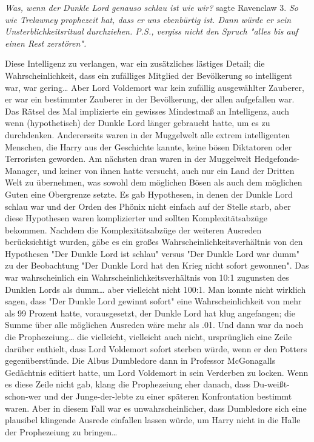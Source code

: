 {\emph{Was, wenn der Dunkle Lord genauso schlau ist wie wir?} sagte Ravenclaw 3. \emph{So wie Trelawney prophezeit hat, dass er uns ebenbürtig ist. Dann würde er sein Unsterblichkeitsritual durchziehen. P.S., vergiss nicht den Spruch "alles bis auf einen Rest zerstören".}

Diese Intelligenz zu verlangen, war ein zusätzliches lästiges Detail; die Wahrscheinlichkeit, dass ein zufälliges Mitglied der Bevölkerung so intelligent war, war gering… Aber Lord Voldemort war kein zufällig ausgewählter Zauberer, er war ein bestimmter Zauberer in der Bevölkerung, der allen aufgefallen war. Das Rätsel des Mal implizierte ein gewisses Mindestmaß an Intelligenz, auch wenn (hypothetisch) der Dunkle Lord länger gebraucht hatte, um es zu durchdenken. Andererseits waren in der Muggelwelt alle extrem intelligenten Menschen, die Harry aus der Geschichte kannte, keine bösen Diktatoren oder Terroristen geworden. Am nächsten dran waren in der Muggelwelt Hedgefonds-Manager, und keiner von ihnen hatte versucht, auch nur ein Land der Dritten Welt zu übernehmen, was sowohl dem möglichen Bösen als auch dem möglichen Guten eine Obergrenze setzte. Es gab Hypothesen, in denen der Dunkle Lord schlau war und der Orden des Phönix nicht einfach auf der Stelle starb, aber diese Hypothesen waren komplizierter und sollten Komplexitätsabzüge bekommen. Nachdem die Komplexitätsabzüge der weiteren Ausreden berücksichtigt wurden, gäbe es ein großes Wahrscheinlichkeitsverhältnis von den Hypothesen "Der Dunkle Lord ist schlau" versus "Der Dunkle Lord war dumm" zu der Beobachtung "Der Dunkle Lord hat den Krieg nicht sofort gewonnen". Das war wahrscheinlich ein Wahrscheinlichkeitsverhältnis von 10:1 zugunsten des Dunklen Lords als dumm… aber vielleicht nicht 100:1. Man konnte nicht wirklich sagen, dass "Der Dunkle Lord gewinnt sofort" eine Wahrscheinlichkeit von mehr als 99 Prozent hatte, vorausgesetzt, der Dunkle Lord hat klug angefangen; die Summe über alle möglichen Ausreden wäre mehr als .01. Und dann war da noch die Prophezeiung… die vielleicht, vielleicht auch nicht, ursprünglich eine Zeile darüber enthielt, dass Lord Voldemort sofort sterben würde, wenn er den Potters gegenüberstünde. Die Albus Dumbledore dann in Professor McGonagalls Gedächtnis editiert hatte, um Lord Voldemort in sein Verderben zu locken. Wenn es diese Zeile nicht gab, klang die Prophezeiung eher danach, dass Du-weißt-schon-wer und der Junge-der-lebte zu einer späteren Konfrontation bestimmt waren. Aber in diesem Fall war es unwahrscheinlicher, dass Dumbledore sich eine plausibel klingende Ausrede einfallen lassen würde, um Harry nicht in die Halle der Prophezeiung zu bringen…

}
